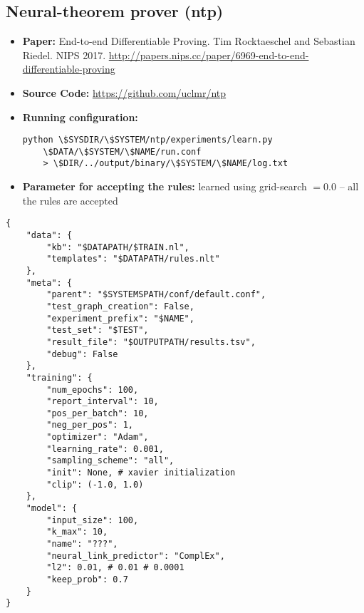 \documentclass[letterpaper]{article} \usepackage{aaai20}  \usepackage{times}  \usepackage{helvet} \usepackage{courier}  \usepackage[hyphens]{url}  \usepackage{graphicx} \urlstyle{rm} \def\UrlFont{\rm}  \usepackage{graphicx}  \frenchspacing  \setlength{\pdfpagewidth}{8.5in}  \setlength{\pdfpageheight}{11in}  \usepackage{amsthm}
\theoremstyle{definition}
\begin{document}
\subsection{Neural-theorem prover (ntp)}
\begin{itemize}
\item {\bf Paper:} End-to-end Differentiable Proving. Tim Rocktaeschel and Sebastian Riedel. NIPS 2017. \url{http://papers.nips.cc/paper/6969-end-to-end-differentiable-proving}
\item {\bf Source Code:} \url{https://github.com/uclmr/ntp}
\item {\bf Running configuration:}
\begin{lstlisting}[basicstyle=\ttfamily\scriptsize,showstringspaces=false]
python \$SYSDIR/\$SYSTEM/ntp/experiments/learn.py
    \$DATA/\$SYSTEM/\$NAME/run.conf 
    > \$DIR/../output/binary/\$SYSTEM/\$NAME/log.txt
\end{lstlisting}
\item {\bf Parameter for accepting the rules:} learned using grid-search $=0.0$ -- all the rules are accepted
\end{itemize}
\begin{lstlisting}[basicstyle=\ttfamily\scriptsize,showstringspaces=false]
{
    "data": {
        "kb": "$DATAPATH/$TRAIN.nl",
        "templates": "$DATAPATH/rules.nlt"
    },
    "meta": {
        "parent": "$SYSTEMSPATH/conf/default.conf",
        "test_graph_creation": False,
        "experiment_prefix": "$NAME",
        "test_set": "$TEST",
        "result_file": "$OUTPUTPATH/results.tsv",
        "debug": False
    },
    "training": {
        "num_epochs": 100,
        "report_interval": 10,
        "pos_per_batch": 10,
        "neg_per_pos": 1,
        "optimizer": "Adam",
        "learning_rate": 0.001,
        "sampling_scheme": "all",
        "init": None, # xavier initialization
        "clip": (-1.0, 1.0)
    },
    "model": {
        "input_size": 100,
        "k_max": 10,
        "name": "???",
        "neural_link_predictor": "ComplEx",
        "l2": 0.01, # 0.01 # 0.0001
        "keep_prob": 0.7
    }
}
\end{lstlisting}
\end{document}
